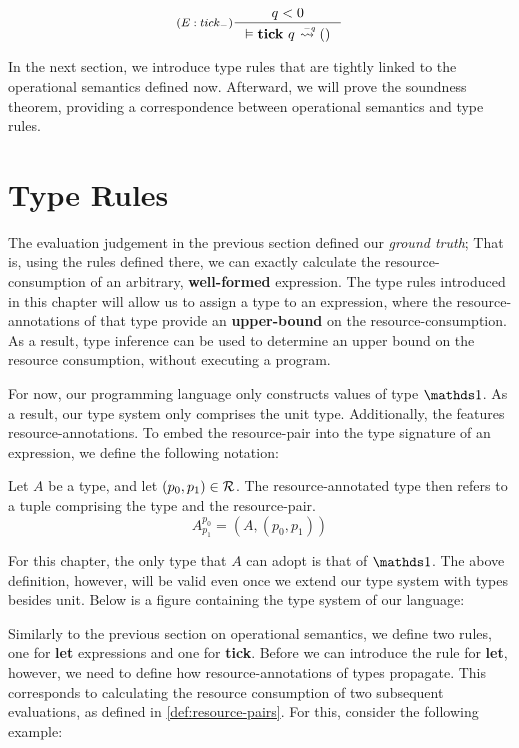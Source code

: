\[
   \inference[\((E:tick_{-})\)]
   {q < 0}
   {\evals{}{\tick{q}}{()}{}{-q}}
\]

In the next section, we introduce type rules that are tightly linked to the operational semantics defined now. Afterward, we will prove the soundness theorem, providing a correspondence between operational semantics and type rules. 

\section{Type Rules}
The evaluation judgement in the previous section defined our \emph{ground truth}; That is, using the rules defined there, we can exactly calculate the resource-consumption of an arbitrary, \textbf{well-formed} expression. The type rules introduced in this chapter will allow us to assign a type to an expression, where the resource-annotations of that type provide an \textbf{upper-bound} on the resource-consumption. As a result, type inference can be used to determine an upper bound on the resource consumption, without executing a program.

For now, our programming language only constructs values of type \(\unit\). As a result, our type system only comprises the unit type. Additionally, the  features resource-annotations. To embed the resource-pair into the type signature of an expression, we define the following notation:

\begin{definition}\label{def:ra-type}
   Let \(A\) be a type, and let \((p_0, p_1) \in \mathcal{R}\). The resource-annotated type then refers to a tuple comprising the type and the resource-pair.
   \[A^{p_0}_{p_1} = (A, (p_0, p_1))\] 
\end{definition}

For this chapter, the only type that \(A\) can adopt is that of \(\unit\). The above definition, however, will be valid even once we extend our type system with types besides unit. Below is a figure containing the type system of our language:


Similarly to the previous section on operational semantics, we define two rules, one for \textbf{let} expressions and one for \textbf{tick}. Before we can introduce the rule for \textbf{let}, however, we need to define how resource-annotations of types propagate. This corresponds to calculating the resource consumption of two subsequent evaluations, as defined in \cref{def:resource-pairs}. For this, consider the following example:

